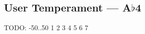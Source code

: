 \subsection{User Temperament --- \UiKey{\I}\UiKey{\SET}A$\flat$4}









































TODO: -50..50
1
2
3
4
5
6
7
